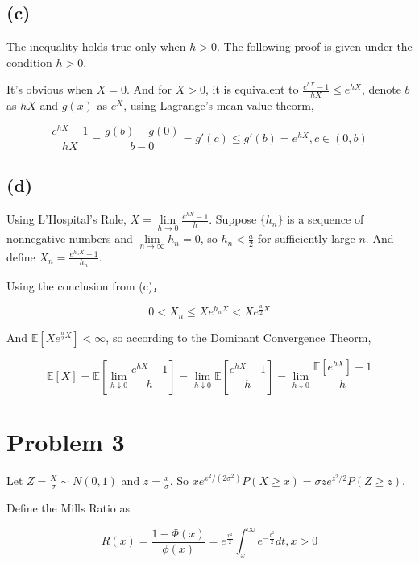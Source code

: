 \documentclass{article}
\begin{document}
\subsection{(c)}

The inequality holds true only when $h>0$. The following proof is given under the condition $h>0$.

It's obvious when $X=0$. And for $X>0$, it is equivalent to $\frac {e^{hX}-1}{hX} \leqslant e^{hX}$, denote $b$ as $hX$ and $g(x)$ as $e^X$, using Lagrange's mean value theorm,

\begin{equation}
    \frac{e^{hX}-1}{hX} = \frac{g(b)-g(0)}{b-0} = g'(c) \leqslant g'(b) = e^{hX}, c \in (0,b)
\end{equation}

\subsection{(d)}

Using L'Hospital's Rule, $X = \lim\limits_{h\to 0} \frac{e^{hX}-1}{h}$. 
Suppose $\{h_n\}$ is a sequence of nonnegative numbers and $\lim\limits_{n\to \infty} h_n = 0$, so $h_n<\frac{a}{2}$ for sufficiently large $n$. And define $X_n = \frac {e^{h_n X}-1}{h_n}$.

Using the conclusion from (c)，

\begin{equation}
    0<X_n\leqslant  Xe^{h_nX} < Xe^{\frac{a}{2}X}
\end{equation}  

And $\mathbb{E}[Xe^{\frac{a}{2}X}] < \infty$, so according to the Dominant Convergence Theorm,

\begin{equation}
    \mathbb{E}[X] = \mathbb{E}[\lim_{h\downarrow 0 } \frac{e^{hX}-1}{h}] = \lim_{h\downarrow 0 } \mathbb{E}[ \frac{e^{hX}-1}{h}] = \lim_{h\downarrow 0 } \frac{\mathbb{E}[e^{hX}]-1}{h}
\end{equation}

\section{Problem 3}

Let $Z= \frac{X}{\sigma} \sim N(0,1)$ and $z  = \frac{x}{\sigma}$. So $xe^{x^2/(2\sigma^2)} P(X\geqslant x) = \sigma z e^{z^2/2} P(Z\geqslant z)$.

Define the Mills Ratio as

\begin{equation}
    R(x) = \frac{1-\Phi(x)}{\phi(x)}  =  e^{\frac{x^2}{2}} \int_{x}^{\infty} e^{-\frac{t^2}{2}} dt,x>0
\end{equation}
\end{document}
